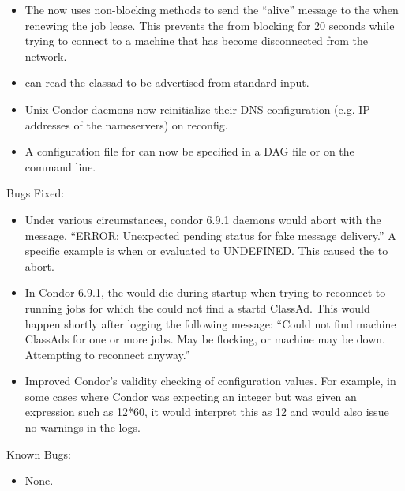 \begin{itemize}
\item The  now uses non-blocking methods to send the
``alive'' message to the  when renewing the job lease.
This prevents the  from blocking for 20 seconds while
trying to connect to a machine that has become disconnected from the
network.

\item {} can read the classad to be advertised from
standard input.

\item Unix Condor daemons now reinitialize their DNS
configuration (e.g. IP addresses of the nameservers) on reconfig.

\item A configuration file for  can now be specified
in a DAG file or on the  command line.

\end{itemize}

\noindent Bugs Fixed:

\begin{itemize}

\item Under various circumstances, condor 6.9.1 daemons would abort
with the message, ``ERROR: Unexpected pending status for fake message
delivery.''  A specific example is when  or
 evaluated to UNDEFINED.  This caused the
 to abort.

\item In Condor 6.9.1, the  would die during startup
when trying to reconnect to running jobs for which the 
could not find a startd ClassAd.  This would happen shortly after
logging the following message: ``Could not find machine ClassAds for
one or more jobs.  May be flocking, or machine may be down.
Attempting to reconnect anyway.''

\item Improved Condor's validity checking of configuration values.
For example, in some cases where Condor was expecting an integer but
was given an expression such as 12*60, it would interpret this as 12
and would also issue no warnings in the logs.

\end{itemize}

\noindent Known Bugs:

\begin{itemize}

\item None.

\end{itemize}



